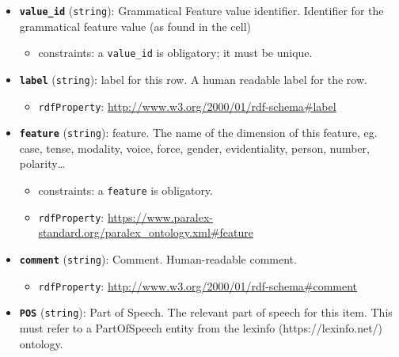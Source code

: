 \begin{itemize}
\item
  \textbf{\texttt{value\_id}} (\texttt{string}): Grammatical Feature
  value identifier. Identifier for the grammatical feature value (as
  found in the cell)

  \begin{itemize}
  \tightlist
  \item
    constraints: a \texttt{value\_id} is obligatory; it must be unique.
  \end{itemize}
\item
  \textbf{\texttt{label}} (\texttt{string}): label for this row. A human
  readable label for the row.

  \begin{itemize}
  \tightlist
  \item
    \texttt{rdfProperty}:
    \url{http://www.w3.org/2000/01/rdf-schema\#label}
  \end{itemize}
\item
  \textbf{\texttt{feature}} (\texttt{string}): feature. The name of the
  dimension of this feature, eg. case, tense, modality, voice, force,
  gender, evidentiality, person, number, polarity\ldots{}

  \begin{itemize}
  \item
    constraints: a \texttt{feature} is obligatory.
  \item
    \texttt{rdfProperty}:
    \url{https://www.paralex-standard.org/paralex_ontology.xml\#feature}
  \end{itemize}
\item
  \textbf{\texttt{comment}} (\texttt{string}): Comment. Human-readable
  comment.

  \begin{itemize}
  \tightlist
  \item
    \texttt{rdfProperty}:
    \url{http://www.w3.org/2000/01/rdf-schema\#comment}
  \end{itemize}
\item
  \textbf{\texttt{POS}} (\texttt{string}): Part of Speech. The relevant
  part of speech for this item. This must refer to a PartOfSpeech entity
  from the lexinfo (https://lexinfo.net/) ontology.


\end{itemize}

